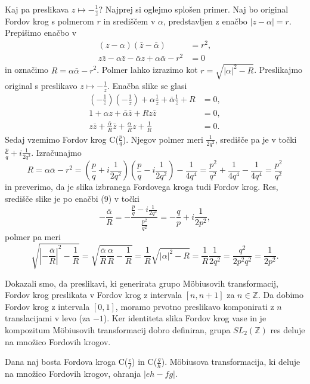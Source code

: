 \documentclass[mat1]{fmfdelo}
\begin{document}
\begin{dokaz}
Kaj pa preslikava $z \mapsto -\frac{1}{z}$? Najprej si oglejmo splošen primer. Naj bo original Fordov krog s polmerom $r$ in središčem v $\alpha$, predstavljen z enačbo $ |z-\alpha|=r$. Prepišimo enačbo v
\begin{align}
(z-\alpha)( \bar{z}-\bar{\alpha}) &= r^2, \nonumber \\
z\bar{z} - \alpha \bar{z} - \bar{\alpha} z + \alpha \bar{\alpha} - r^2 &= 0
\end{align}
in označimo $R = \alpha \bar{\alpha} - r^2$. Polmer lahko izrazimo kot $r = \sqrt{|\alpha|^2-R}$.
Preslikajmo original s preslikavo $z \mapsto -\frac{1}{z}$. Enačba slike se glasi
\begin{align}
\left(-\frac{1}{z}\right)\left(-\frac{1}{\bar{z}}\right) + \alpha \frac{1}{\bar{z}} + \bar{\alpha} \frac{1}{z} + R &= 0, \nonumber \\
1 + \alpha z + \bar{\alpha} \bar{z} + Rz \bar{z} &= 0, \nonumber \\
z \bar{z} + \frac{\bar{\alpha}}{R} \bar{z} + \frac{\alpha}{R} z + \frac{1}{R} &= 0.
\end{align}
Sedaj vzemimo Fordov krog C($\frac{p}{q}$). Njegov polmer meri $\frac{1}{2q^2}$, središče pa je v točki $\frac{p}{q} +i \frac{1}{2q^2}$.
Izračunajmo
\[ R = \alpha \bar{\alpha} - r^2 = \left(\frac{p}{q} + i\frac{1}{2q^2} \right) \left(\frac{p}{q} - i\frac{1}{2q^2} \right) - \frac{1}{4q^4} 
= \frac{p^2}{q^2} + \frac{1}{4q^4} - \frac{1}{4q^4} = \frac{p^2}{q^2} \]
in preverimo, da je slika izbranega Fordovega kroga tudi Fordov krog. Res, središče slike je po enačbi (9) v točki
\[ -\frac{\bar{\alpha}}{R} = - \frac{\frac{p}{q} - i \frac{1}{2q^2}}{\frac{p^2}{q^2}} = - \frac{q}{p} + i \frac{1}{2p^2}, \]
polmer pa meri
\[ \sqrt{ \left| - \frac{\bar{\alpha}}{R} \right|^2 - \frac{1}{R} } = \sqrt{ \frac{\bar{\alpha}}{R} \frac{\alpha}{R} - \frac{1}{R} } 
= \frac{1}{R} \sqrt{|\alpha|^2 - R} =  \frac{1}{R} \frac{1}{2q^2} = \frac{q^2}{2p^2 q^2} = \frac{1}{2p^2}. \]

Dokazali smo, da preslikavi, ki generirata grupo M\"{o}biusovih transformacij, Fordov krog preslikata v Fordov krog z intervala $[n,n+1]$ za $n \in \mathbb{Z}$. Da dobimo Fordov krog z intervala $[0,1]$, moramo prvotno preslikavo komponirati z $n$ translacijami v levo (za $-1$). Ker identiteta slika Fordov krog vase in je kompozitum M\"{o}biusovih transformacij dobro definiran, grupa ${SL}_{2}(\mathbb{Z})$ res deluje na množico Fordovih krogov.
\end{dokaz}

\begin{lema}
Dana naj bosta Fordova kroga C($\frac{e}{f}$) in C($\frac{g}{h}$). M\"{o}biusova transformacija, ki deluje na množico Fordovih krogov, ohranja $|eh-fg|$.
\end{lema}
\end{document}
